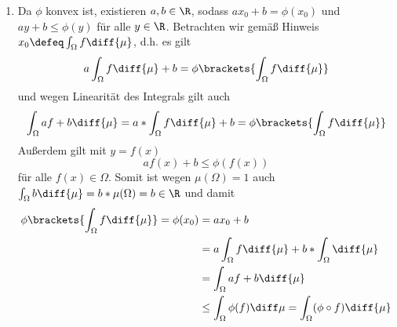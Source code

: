 \begin{exercisePage}
	\begin{enumerate}[leftmargin=*, label = (zu \alph*)]
		\item Da $\phi$ konvex ist, existieren $a, b \in \R$, sodass $ax_0 + b = \phi(x_0)$ und $ay + b \le \phi(y)$ für alle $y \in \R$. Betrachten wir gemäß Hinweis $x_0 \defeq \int_\Omega f \diff{\mu}$, d.h. es gilt
		\begin{equation*}
			a \int_\Omega f \diff{\mu} + b = \phi\brackets{\int_\Omega f \diff{\mu}}
		\end{equation*}
		und wegen Linearität des Integrals gilt auch 
		\begin{equation*}
			\int_\Omega af + b \diff{\mu} = a * \int_\Omega f \diff{\mu} + b = \phi\brackets{\int_\Omega f \diff{\mu}}
		\end{equation*}
		Außerdem gilt mit $y = f(x)$ 
		\begin{equation*}
			a f(x) + b \le \phi(f(x)) 
		\end{equation*}
		für alle $f(x) \in \Omega$. Somit ist wegen $\mu(\Omega) = 1$ auch $\int_\Omega b \diff{\mu} = b * \mu(\Omega) = b \in \R$ und damit
		\begin{equation*}
			\begin{aligned}
				\phi\brackets{\int_\Omega f \diff{\mu}} = \phi(x_0) &= ax_0 + b \\
				&= a \int_\Omega f \diff{\mu} + b * \int_\Omega  \diff{\mu} \\
				&= \int_\Omega af + b \diff{\mu} \\
				&\le \int_\Omega \phi(f) \diff\mu = \int_\Omega (\phi \circ f) \diff{\mu}
			\end{aligned}
		\end{equation*}
	\end{enumerate}
\end{exercisePage}